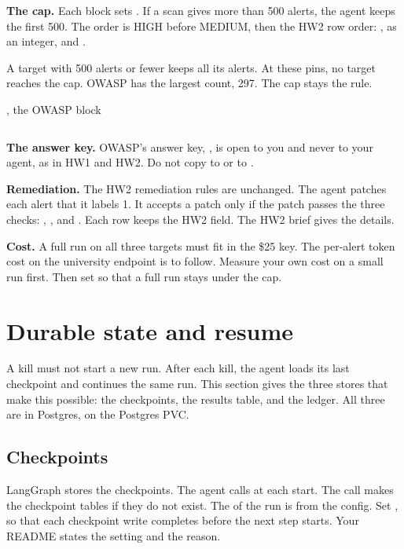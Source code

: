 \documentclass[9pt,letterpaper]{article}
\newcommand\filelisting[4][]{%
  \par\smallskip\noindent\begin{minipage}{\linewidth}%
  \centerline{\small #2}\smallskip\inputminted[#1]{#3}{#4}\end{minipage}\par\smallskip}
\begin{document}
\textbf{The cap.} Each block sets . If a scan gives more
than 500 alerts, the agent keeps the first 500. The order is HIGH before MEDIUM,
then the HW2 row order: ,  as an integer, and
.

A target with 500 alerts or fewer keeps all its alerts. At these
pins, no target reaches the cap. OWASP has the largest count, 297. The cap stays
the rule.

\filelisting{, the OWASP
\code{[scan]} block}{toml}{scan/owasp-benchmark-python.toml}

\textbf{The answer key.} OWASP's answer key, , is
open to you and never to your agent, as in HW1 and HW2. Do not copy
 to  or to .

\textbf{Remediation.} The HW2 remediation rules are unchanged. The agent patches
each alert that it labels 1. It accepts a patch only if the patch passes the
three checks: , , and
. Each row keeps the HW2  field. The HW2
brief gives the details.

\textbf{Cost.} A full run on all three targets must fit in the \$25 key.
The per-alert token cost on the university endpoint is to follow. Measure your
own cost on a small run first. Then set  so that a full
run stays under the cap.

\section{Durable state and resume}\label{sec:state}

A kill must not start a new run. After each kill, the agent loads its last
checkpoint and continues the same run. This section gives the three stores that
make this possible: the checkpoints, the results table, and the ledger. All three
are in Postgres, on the Postgres PVC.

\subsection{Checkpoints}\label{sec:checkpoints}

LangGraph  stores the checkpoints. The agent calls
 at each start. The call makes the checkpoint tables if they do not
exist. The  of the run is  from the config. Set
, so that each checkpoint write completes before the
next step starts. Your README states the setting and the reason.
\end{document}
